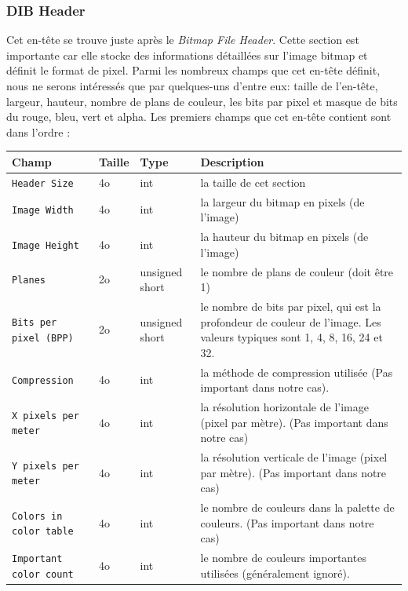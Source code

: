 \documentclass[a4paper]{article}
\begin{document}
	\subsubsection*{DIB Header}
		Cet en-tête se trouve juste après le \textit{Bitmap File Header}. Cette section est importante car elle stocke des informations détaillées sur l'image bitmap et définit le format de pixel. Parmi les nombreux champs que cet en-tête définit, nous ne serons intéressés que par quelques-uns d'entre eux: taille de l'en-tête, largeur, hauteur, nombre de plans de couleur, les bits par pixel et masque de bits du rouge, bleu, vert et alpha.
		Les premiers champs que cet en-tête contient sont dans l'ordre :
		\begin{center}
			\begin{tabular}{ | p{4cm} | p{0.8cm} | p{1.2cm} | p{10cm} | } 
				\hline
				\textbf{Champ}  				& \textbf{Taille}& \textbf{Type} & \textbf{Description} \\ 
				\hline
				\texttt{Header Size}  		    & 4o 	 & int  & la taille de cet section \\ 
				\hline
				\texttt{Image Width} 			& 4o 	 & int  & la largeur du bitmap en pixels (de l'image) \\ 
				\hline
				\texttt{Image Height} 		    & 4o     & int  & la hauteur du bitmap en pixels (de l'image) \\
				\hline
				\texttt{Planes} 				& 2o 	 & unsigned short& le nombre de plans de couleur (doit être 1) \\
				\hline
				\texttt{Bits per pixel (BPP)}   & 2o     & unsigned short& le nombre de bits par pixel, qui est la profondeur de couleur de l'image. Les valeurs typiques sont 1, 4, 8, 16, 24 et 32. \\
				\hline
				\texttt{Compression} 			& 4o     & int  & la méthode de compression utilisée (Pas important dans notre cas). \\
				\hline
				\texttt{X pixels per meter} 	& 4o     & int  & la résolution horizontale de l'image (pixel par mètre). (Pas important dans notre cas) \\
				\hline
				\texttt{Y pixels per meter} 	& 4o     & int  & la résolution verticale de l'image (pixel par mètre). (Pas important dans notre cas) \\
				\hline
				\texttt{Colors in color table}  & 4o     & int  & le nombre de couleurs dans la palette de couleurs. (Pas important dans notre cas) \\
				\hline
				\texttt{Important color count}  & 4o     & int  & le nombre de couleurs importantes utilisées (généralement ignoré). \\

\end{tabular}
\end{center}
\end{document}
